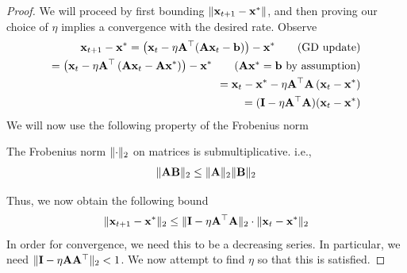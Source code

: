     \begin{proof}
    We will proceed by first bounding $\lVert \mathbf{x}_{t + 1} - \mathbf{x}^* \rVert$, and then proving our choice of $\eta$ implies a convergence with the desired rate. Observe
\begin{align*}
    \bx_{t+1} - \bx^* = \lp \bx_t - \eta\A^\top(\A\bx_t - {\bf b}) \rp - \bx^* \tag{GD update}\\
    = \lp \bx_t - \eta \A^\top \lp \A\bx_t - \A\bx^* \rp \rp - \bx^* \tag{$\A\bx^* = {\bf b}$ by assumption}\\
    = \bx_t - \bx^* - \eta \A^\top\A \lp \bx_t - \bx^* \rp \\
    = (\I - \eta \A^\top \A)(\bx_t - \bx^*)
\end{align*}
We will now use the following property of the Frobenius norm
\begin{prop}
    The Frobenius norm $\lVert \cdot \rVert_2$ on matrices is submultiplicative. i.e.,
    \begin{align*}
        \lVert \mathbf{A} {\bf B} \rVert_2 \leq \lVert \mathbf{A} \rVert_2 \lVert {\bf B} \rVert_2
    \end{align*}
\end{prop}
Thus, we now obtain the following bound
\begin{align*}
    \lVert \mathbf{x}_{t + 1} - \mathbf{x}^* \rVert_2 \leq \lVert \mathbf{I} - \eta \mathbf{A}^\top\mathbf{A} \rVert_2 \cdot \lVert \mathbf{x}_t - \mathbf{x}^* \rVert_2
\end{align*}
In order for convergence, we need this to be a decreasing series. In particular, we need $\lVert \mathbf{I} - \eta \mathbf{A}\mathbf{A}^\top \rVert_2 < 1$. We now attempt to find $\eta$ so that this is satisfied.


\end{proof}
